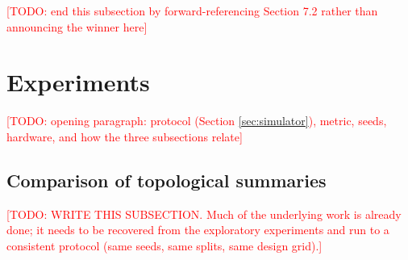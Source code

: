 \documentclass[11pt,letterpaper]{article}
\newcommand{\1}{\mathds{1}}
\newcommand{\todo}[1]{\textcolor{red}{[TODO: #1]}}
\newcommand{\todo}[1]{}
\theoremstyle{plain}
\theoremstyle{definitioncolon}
\begin{document}
\todo{end this subsection by forward-referencing Section 7.2 rather than
announcing the winner here}


%
\section{Experiments}
\label{sec:experiments}

\todo{opening paragraph: protocol (Section \ref{sec:simulator}), metric, seeds,
hardware, and how the three subsections relate}

\subsection{Comparison of topological summaries}
\label{ssec:exp-summaries}
%
\todo{WRITE THIS SUBSECTION. Much of the underlying work is already done; it
needs to be recovered from the exploratory experiments and run to a consistent
protocol (same seeds, same splits, same design grid).}
\end{document}
